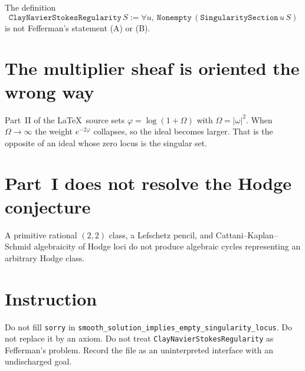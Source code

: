\documentclass[11pt,a4paper]{article}
\theoremstyle{definition}
\theoremstyle{remark}
\newcommand{\abs}[1]{\lvert#1\rvert}
\begin{document}
The definition
\[
\texttt{ClayNavierStokesRegularity}\,S
:=\forall u,\ \texttt{Nonempty}\,(\texttt{SingularitySection}\,u\,S)
\]
is not Fefferman's statement (A) or (B).

\section{The multiplier sheaf is oriented the wrong way}

Part~II of the \LaTeX\ source sets $\varphi=\log(1+\Omega)$ with $\Omega=\abs{\omega}^2$. When $\Omega\to\infty$ the weight $e^{-2\varphi}$ collapses, so the ideal becomes larger. That is the opposite of an ideal whose zero locus is the singular set.

\section{Part~I does not resolve the Hodge conjecture}

A primitive rational $(2,2)$ class, a Lefschetz pencil, and Cattani--Kaplan--Schmid algebraicity of Hodge loci do not produce algebraic cycles representing an arbitrary Hodge class.

\section{Instruction}

Do not fill \texttt{sorry} in \texttt{smooth\_solution\_implies\_empty\_singularity\_locus}. Do not replace it by an axiom. Do not treat \texttt{ClayNavierStokesRegularity} as Fefferman's problem. Record the file as an uninterpreted interface with an undischarged goal.
\end{document}

